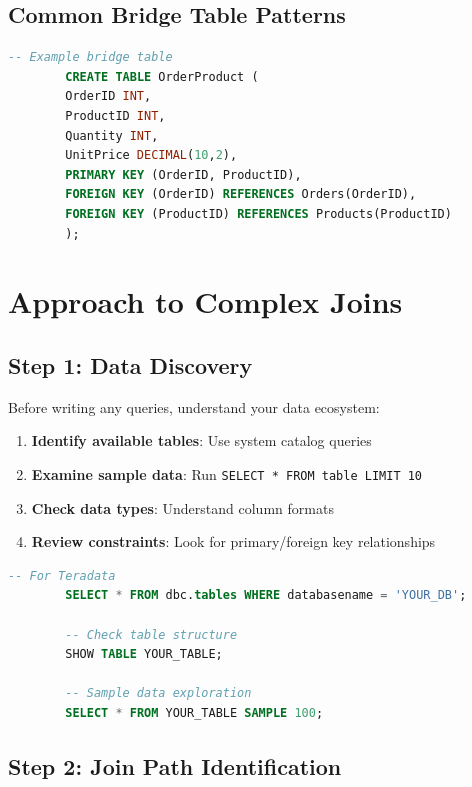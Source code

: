 \documentclass{article}
\begin{document}
	\subsection{Common Bridge Table Patterns}
	
	\begin{lstlisting}[language=SQL, caption=Typical Bridge Table Structure]
		-- Example bridge table
		CREATE TABLE OrderProduct (
		OrderID INT,
		ProductID INT,
		Quantity INT,
		UnitPrice DECIMAL(10,2),
		PRIMARY KEY (OrderID, ProductID),
		FOREIGN KEY (OrderID) REFERENCES Orders(OrderID),
		FOREIGN KEY (ProductID) REFERENCES Products(ProductID)
		);
	\end{lstlisting}
	
	\section{Approach to Complex Joins}
	
	\subsection{Step 1: Data Discovery}
	
	Before writing any queries, understand your data ecosystem:
	
	\begin{enumerate}
		\item \textbf{Identify available tables}: Use system catalog queries
		\item \textbf{Examine sample data}: Run \texttt{SELECT * FROM table LIMIT 10}
		\item \textbf{Check data types}: Understand column formats
		\item \textbf{Review constraints}: Look for primary/foreign key relationships
	\end{enumerate}
	
	\begin{lstlisting}[language=SQL, caption=Data Discovery Queries]
		-- For Teradata
		SELECT * FROM dbc.tables WHERE databasename = 'YOUR_DB';
		
		-- Check table structure
		SHOW TABLE YOUR_TABLE;
		
		-- Sample data exploration
		SELECT * FROM YOUR_TABLE SAMPLE 100;
	\end{lstlisting}
	
	\subsection{Step 2: Join Path Identification}
	
\end{document}
